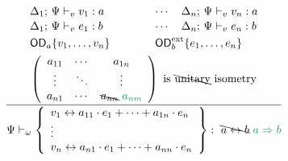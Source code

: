 \documentclass[12pt]{article}
\newcommand{\gr}[1]{\textcolor{ForestGreen}{#1}}
\newcommand{\kw}[1]{\mathsf{#1}}
\begin{document}
\[
\frac{%
\begin{array}{l@{\qquad\qquad}l}
\Delta_{1};\,\Psi \vdash_{v} v_{1} : a & \cdots \quad \Delta_{n};\,\Psi \vdash_{v} v_{n} : a \\[0.3ex]
\Delta_{1};\,\Psi \vdash_{v} e_{1} : b & \cdots \quad \Delta_{n};\,\Psi \vdash_{v} e_{n} : b \\[0.6ex]
\kw{OD}_{a}\{v_{1},\ldots,v_{n}\} & \kw{OD}_{b}^{\mathrm{ext}}\{e_{1},\ldots,e_{n}\} \\[1ex]
\multicolumn{2}{c}{%
\left(
\begin{array}{ccc}
a_{11} & \cdots & a_{1n} \\
\vdots & \ddots & \vdots \\
a_{n1} & \cdots & \bcancel{a_{nn}}\ \gr{a_{nm}}
\end{array}
\right)\ \text{is } \bcancel{\text{unitary}} \text{ isometry}%
}
\end{array}
}{%
\Psi \vdash_{\omega}
\left\{
\begin{array}{l}
v_{1} \leftrightarrow a_{11}\cdot e_{1} + \cdots + a_{1n}\cdot e_{n} \\
\vdots \\
v_{n} \leftrightarrow a_{n1}\cdot e_{1} + \cdots + a_{nn}\cdot e_{n}
\end{array}
\right\}
:\ \bcancel{a \leftrightarrow b}\ \gr{a \Rightarrow b}
}
\]
\end{document}
